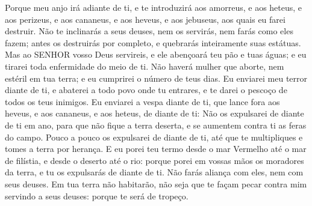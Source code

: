 {{  Porque meu anjo irá adiante de ti, e te introduzirá aos amorreus, e aos heteus, e aos perizeus, e aos cananeus, e aos heveus, e aos jebuseus, aos quais eu farei destruir.
  Não te inclinarás a seus deuses, nem os servirás, nem farás como eles fazem; antes os destruirás por completo, e quebrarás inteiramente suas estátuas.
  Mas ao SENHOR vosso Deus servireis, e ele abençoará teu pão e tuas águas; e eu tirarei toda enfermidade do meio de ti.
  Não haverá mulher que aborte, nem estéril em tua terra; e eu cumprirei o número de teus dias.
  Eu enviarei meu terror diante de ti, e abaterei a todo povo onde tu entrares, e te darei o pescoço de todos os teus inimigos.
  Eu enviarei a vespa diante de ti, que lance fora aos heveus, e aos cananeus, e aos heteus, de diante de ti:
  Não os expulsarei de diante de ti em ano, para que não fique a terra deserta, e se aumentem contra ti as feras do campo.
  Pouco a pouco os expulsarei de diante de ti, até que te multipliques e tomes a terra por herança.
  E eu porei teu termo desde o mar Vermelho até o mar de filístia, e desde o deserto até o rio: porque porei em vossas mãos os moradores da terra, e tu os expulsarás de diante de ti.
  Não farás aliança com eles, nem com seus deuses.
  Em tua terra não habitarão, não seja que te façam pecar contra mim servindo a seus deuses: porque te será de tropeço}.
\par }

